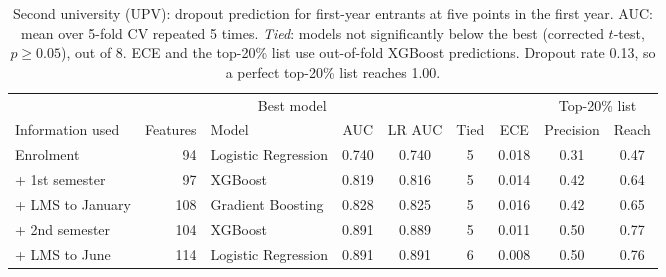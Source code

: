 \begin{table}[H]
\centering
\small
\setlength{\tabcolsep}{4pt}
\caption{Second university (UPV): dropout prediction for first-year entrants at five points in the first year. AUC: mean over 5-fold CV repeated 5 times. \emph{Tied}: models not significantly below the best (corrected $t$-test, $p \ge 0.05$), out of 8. ECE and the top-20\% list use out-of-fold XGBoost predictions. Dropout rate 0.13, so a perfect top-20\% list reaches 1.00.}
\label{tab:upv_stages}
\begin{tabular}{lrlcccccc}
\toprule
 & & \multicolumn{2}{c}{Best model} & & & & \multicolumn{2}{c}{Top-20\% list} \\
\cmidrule(lr){3-4}\cmidrule(lr){8-9}
Information used & Features & Model & AUC & LR AUC & Tied & ECE & Precision & Reach \\
\midrule
Enrolment & 94 & Logistic Regression & 0.740 & 0.740 & 5 & 0.018 & 0.31 & 0.47 \\
+ 1st semester & 97 & XGBoost & 0.819 & 0.816 & 5 & 0.014 & 0.42 & 0.64 \\
+ LMS to January & 108 & Gradient Boosting & 0.828 & 0.825 & 5 & 0.016 & 0.42 & 0.65 \\
+ 2nd semester & 104 & XGBoost & 0.891 & 0.889 & 5 & 0.011 & 0.50 & 0.77 \\
+ LMS to June & 114 & Logistic Regression & 0.891 & 0.891 & 6 & 0.008 & 0.50 & 0.76 \\
\bottomrule
\end{tabular}
\end{table}
